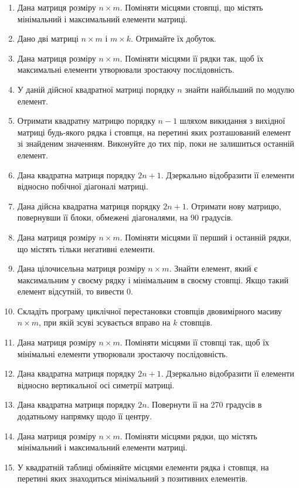 \documentclass[]{article}
\begin{document}
\begin{enumerate}
\item
  Дана матриця розміру $n \times m$. Поміняти місцями стовпці, що містять
  мінімальний і максимальний елементи матриці.
\item
  Дано дві матриці $n \times m$ і $m \times k$. Отримайте їх добуток.
\item
  Дана матриця розміру $n \times m$. Поміняти місцями її рядки так, щоб їх
  максимальні елементи утворювали зростаючу послідовність.
\item
  У даній дійсної квадратної матриці порядку $n$ знайти найбільший по
  модулю елемент.
\item
  Отримати квадратну матрицю порядку $n - 1$ шляхом викидання з вихідної
  матриці будь-якого рядка і стовпця, на перетині яких розташований
  елемент зі знайденим значенням. Виконуйте до тих пір, поки не
  залишиться останній елемент.
\item
  Дана квадратна матриця порядку $2n + 1$. Дзеркально відобразити її
  елементи відносно побічної діагоналі матриці.
\item
  Дана дійсна квадратна матриця порядку $2n + 1$. Отримати нову матрицю,
  повернувши її блоки, обмежені діагоналями, на 90 градусів.
\item
  Дана матриця розміру $n \times m$. Поміняти місцями її перший і останній
  рядки, що містять тільки негативні елементи.
\item
  Дана цілочисельна матриця розміру $n \times m$. Знайти елемент, який є
  максимальним у своєму рядку і мінімальним в своєму стовпці. Якщо такий
  елемент відсутній, то вивести 0.
\item
  Складіть програму циклічної перестановки стовпців двовимірного масиву
  $n \times m$, при якій зсуві зсувається вправо на $k$ стовпців.
\item
  Дана матриця розміру $n \times m$. Поміняти місцями її стовпці так, щоб їх
  мінімальні елементи утворювали зростаючу послідовність.
\item
  Дана квадратна матриця порядку $2n + 1$. Дзеркально відобразити її
  елементи відносно вертикальної осі симетрії матриці.
\item
  Дана квадратна матриця порядку $2n$. Повернути її на 270 градусів в
  додатньому напрямку щодо її центру.
\item
  Дана матриця розміру $n \times m$. Поміняти місцями рядки, що містять
  мінімальний і максимальний елементи матриці.
\item
  У квадратній таблиці обміняйте місцями елементи рядка і стовпця, на
  перетині яких знаходиться мінімальний з позитивних елементів.

\end{enumerate}
\end{document}
